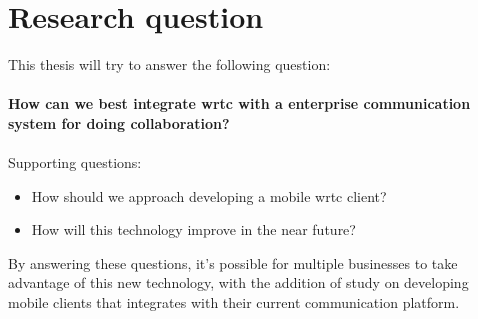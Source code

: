 



\section{Research question}
This thesis will try to answer the following question:
\\
\\
\textbf{How can we best integrate \gls{wrtc} with a enterprise communication system for doing collaboration?}
\\
\\
Supporting questions:

\begin{itemize}
    \item How should we approach developing a mobile \gls{wrtc} client?
    \item How will this technology improve in the near future?
\end{itemize}

By answering these questions, it's possible for multiple businesses to take advantage of this new technology, with the addition of study on developing mobile clients that integrates with their current communication platform.

